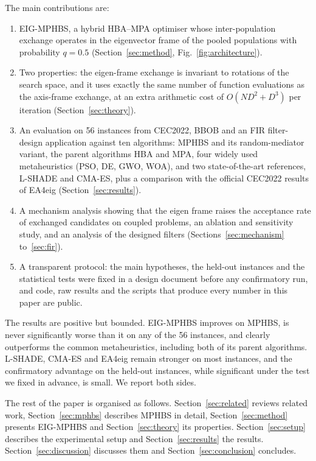 \documentclass[preprint,12pt,authoryear]{elsarticle}
\theoremstyle{remark}
\begin{document}
The main contributions are:
\begin{enumerate}
\item EIG-MPHBS, a hybrid HBA--MPA optimiser whose inter-population exchange operates in the eigenvector frame of the
pooled populations with probability $q=0.5$ (Section~\ref{sec:method}, Fig.~\ref{fig:architecture}).
\item Two properties: the eigen-frame exchange is invariant to rotations of the search space, and it uses exactly the
same number of function evaluations as the axis-frame exchange, at an extra arithmetic cost of $O(ND^2+D^3)$ per
iteration (Section~\ref{sec:theory}).
\item An evaluation on 56 instances from CEC2022, BBOB and an FIR filter-design application against ten algorithms:
MPHBS and its random-mediator variant, the parent algorithms HBA and MPA, four widely used metaheuristics (PSO, DE, GWO,
WOA), and two state-of-the-art references, L-SHADE and CMA-ES, plus a comparison with the official CEC2022 results of
EA4eig (Section~\ref{sec:results}).
\item A mechanism analysis showing that the eigen frame raises the acceptance rate of exchanged candidates on coupled
problems, an ablation and sensitivity study, and an analysis of the designed filters (Sections~\ref{sec:mechanism}
to~\ref{sec:fir}).
\item A transparent protocol: the main hypotheses, the held-out instances and the statistical tests were fixed in a
design document before any confirmatory run, and code, raw results and the scripts that produce every number in this
paper are public.
\end{enumerate}

The results are positive but bounded. EIG-MPHBS improves on MPHBS, is never significantly worse than it on any of the
56 instances, and clearly outperforms the common metaheuristics, including both of its parent algorithms. L-SHADE,
CMA-ES and EA4eig remain stronger on most instances, and the confirmatory advantage on the held-out instances, while
significant under the test we fixed in advance, is small. We report both sides.

The rest of the paper is organised as follows. Section~\ref{sec:related} reviews related work, Section~\ref{sec:mphbs}
describes MPHBS in detail, Section~\ref{sec:method} presents EIG-MPHBS and Section~\ref{sec:theory} its properties.
Section~\ref{sec:setup} describes the experimental setup and Section~\ref{sec:results} the results.
Section~\ref{sec:discussion} discusses them and Section~\ref{sec:conclusion} concludes.
\end{document}
